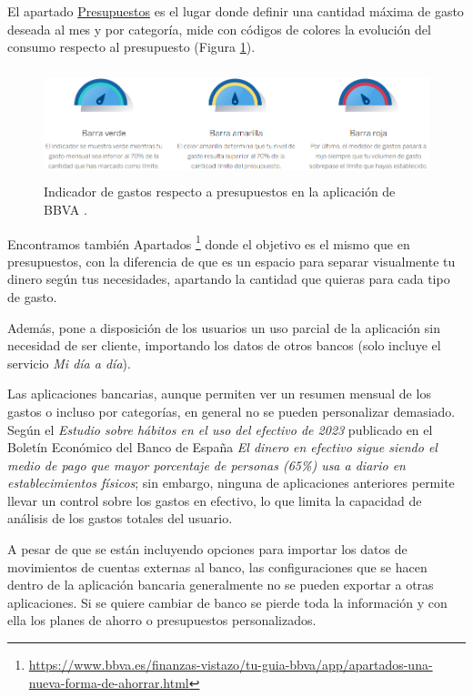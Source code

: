 \begin{itemize}
    El apartado \href{ttps://www.bbva.es/general/salud-financiera/economia-domestica/gestor-de-gastos-y-presupuestos.html}{Presupuestos} 
    es el lugar donde definir una cantidad máxima de gasto deseada 
    al mes y por categoría, mide con códigos de colores la evolución del consumo 
    respecto al presupuesto (Figura \ref{fig:indicador_presupuestos_BBVA}).
    
    \begin{figure}[ht!]
    \centering
    \includegraphics[height = 32mm]{imagenes/indicador_presupuestos_BBVA.png}
    \caption{Indicador de gastos respecto a presupuestos en la aplicación de BBVA
    \cite{presupuestos-BBVA}.}
    \label{fig:indicador_presupuestos_BBVA}
    \end{figure}

    Encontramos también Apartados 
    \footnote{\url{https://www.bbva.es/finanzas-vistazo/tu-guia-bbva/app/apartados-una-nueva-forma-de-ahorrar.html}}
    donde el objetivo es el mismo que en presupuestos, con la diferencia de 
    que es un espacio para separar visualmente tu dinero según tus necesidades,
    apartando la cantidad que quieras para cada tipo de gasto.

    Además, pone a disposición de los usuarios un uso parcial de la aplicación sin necesidad 
    de ser cliente, importando los datos de otros bancos (solo incluye el 
    servicio \textit{Mi día a día}).

\end{itemize}

Las aplicaciones bancarias, aunque permiten ver un resumen mensual de los gastos o incluso por categorías, en general no se pueden personalizar demasiado. Según el \textit{Estudio sobre hábitos en el uso del efectivo de 2023} publicado en el Boletín Económico del Banco de España \textit{El dinero en efectivo sigue siendo el medio de pago que mayor porcentaje de personas (65\%) usa a diario en establecimientos físicos}\cite{2023estudio-efectivo}; sin embargo, ninguna de aplicaciones anteriores permite llevar un control sobre los gastos en efectivo, lo que limita la capacidad de análisis de los gastos totales del usuario.

A pesar de que se están incluyendo opciones para importar los datos de movimientos de 
cuentas externas al banco, las configuraciones que se hacen dentro de 
la aplicación bancaria generalmente no se pueden exportar a otras aplicaciones.
Si se quiere cambiar de banco se pierde toda la información 
y con ella los planes de ahorro o presupuestos personalizados.

